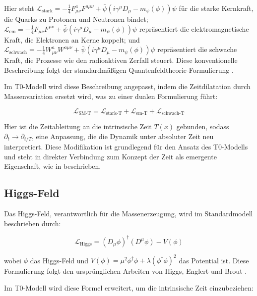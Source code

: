 \documentclass[a4paper,12pt]{article}
\newcommand{\Tfield}{T(x)}
\begin{document}
	Hier steht \(\mathcal{L}_\text{stark} = -\frac{1}{4} F_{\mu\nu}^a F^{a\mu\nu} + \bar{\psi}(i \gamma^\mu D_\mu - m_\psi(\phi))\psi\) für die starke Kernkraft, die Quarks zu Protonen und Neutronen bindet; \(\mathcal{L}_\text{em} = -\frac{1}{4} F_{\mu\nu} F^{\mu\nu} + \bar{\psi}(i \gamma^\mu D_\mu - m_\psi(\phi))\psi\) repräsentiert die elektromagnetische Kraft, die Elektronen an Kerne koppelt; und \(\mathcal{L}_\text{schwach} = -\frac{1}{4} W_{\mu\nu}^a W^{a\mu\nu} + \bar{\psi}(i \gamma^\mu D_\mu - m_\psi(\phi))\psi\) repräsentiert die schwache Kraft, die Prozesse wie den radioaktiven Zerfall steuert. Diese konventionelle Beschreibung folgt der standardmäßigen Quantenfeldtheorie-Formulierung \cite{weinberg1995quantum}.
	
	Im T0-Modell wird diese Beschreibung angepasst, indem die Zeitdilatation durch Massenvariation ersetzt wird, was zu einer dualen Formulierung führt:
	
	\begin{equation}
		\mathcal{L}_\text{SM-T} = \mathcal{L}_\text{stark-T} + \mathcal{L}_\text{em-T} + \mathcal{L}_\text{schwach-T}
	\end{equation}
	
	Hier ist die Zeitableitung an die intrinsische Zeit \(\Tfield\) gebunden, sodass \(\partial_t \rightarrow \partial_{t/T}\), eine Anpassung, die die Dynamik unter absoluter Zeit neu interpretiert. Diese Modifikation ist grundlegend für den Ansatz des T0-Modells und steht in direkter Verbindung zum Konzept der Zeit als emergente Eigenschaft, wie in \cite{pascher_zeit_2025} beschrieben.
	
	\subsection{Higgs-Feld}
	
	Das Higgs-Feld, verantwortlich für die Massenerzeugung, wird im Standardmodell beschrieben durch:
	
	\begin{equation}
		\mathcal{L}_\text{Higgs} = (D_\mu \phi)^\dagger (D^\mu \phi) - V(\phi)
	\end{equation}
	
	wobei \(\phi\) das Higgs-Feld und \(V(\phi) = \mu^2 \phi^\dagger \phi + \lambda (\phi^\dagger \phi)^2\) das Potential ist. Diese Formulierung folgt den ursprünglichen Arbeiten von Higgs, Englert und Brout \cite{higgs1964broken, englert1964broken}.
	
	Im T0-Modell wird diese Formel erweitert, um die intrinsische Zeit einzubeziehen:
	
\end{document}
